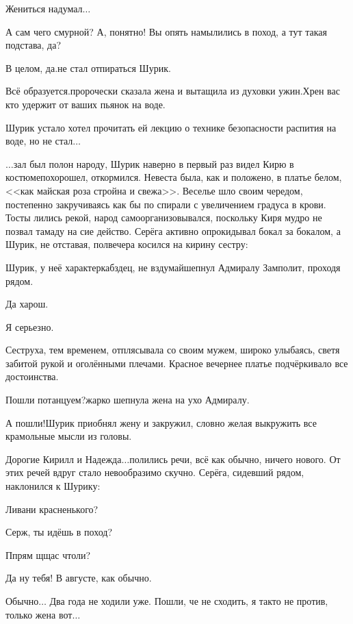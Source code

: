 \diagdash Жениться надумал$\ldots$ 

\diagdash А сам чего смурной? А, понятно! Вы опять намылились в поход, а тут такая подстава, да?

\diagdash В целом, да.\mdash не стал отпираться Шурик.

\diagdash Всё образуется.\mdash пророчески сказала жена и вытащила из духовки ужин.\mdash Хрен вас кто удержит от ваших пьянок на воде.

Шурик устало хотел прочитать ей лекцию о технике безопасности распития на воде, но не стал$\ldots$ 

\vspace{1cm}

$\ldots$зал был полон народу, Шурик наверно в первый раз видел Кирю в костюме\mdash похорошел, откормился. Невеста была, как и положено, в платье белом, <<как майская роза стройна и свежа>>. Веселье шло своим чередом, постепенно закручиваясь как бы по спирали с увеличением градуса в крови. Тосты лились рекой, народ самоорганизовывался, поскольку Киря мудро не позвал тамаду на сие действо. Серёга активно опрокидывал бокал за бокалом, а Шурик, не отставая, полвечера косился на кирину сестру:

\diagdash Шурик, у неё характер\mdash кабздец, не вздумай\mdash шепнул Адмиралу Замполит, проходя рядом. 

\diagdash Да харош.

\diagdash Я серьезно.

Сеструха, тем временем, отплясывала со своим мужем, широко улыбаясь, светя забитой рукой и оголёнными плечами. Красное вечернее платье подчёркивало все достоинства.

\diagdash Пошли потанцуем?\mdash жарко шепнула жена на ухо Адмиралу.

\diagdash А пошли!\mdash Шурик приобнял жену и закружил, словно желая выкружить все крамольные мысли из головы. 

\diagdash Дорогие Кирилл и Надежда$\ldots$\mdash полились речи, всё как обычно, ничего нового. От этих речей вдруг стало невообразимо скучно. Серёга, сидевший рядом, наклонился к Шурику:

\diagdash Ливани красненького?

\diagdash Серж, ты идёшь в поход? 

\diagdash П\sdash прям щ\sdash щас чтоли?

\diagdash Да ну тебя! В августе, как обычно.

\diagdash Обычно$\ldots$ Два года не ходили уже. Пошли, че не сходить, я так\sdash то не против, только жена вот$\ldots$

